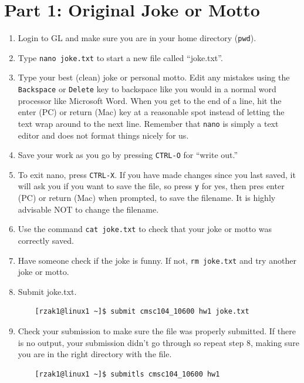 \documentclass[letter,11pt]{article}
\begin{document}
\section*{Part 1: Original Joke or Motto}
\begin{enumerate}
    \item Login to GL and make sure you are in your home directory (\texttt{pwd}).
    \item Type \texttt{nano joke.txt} to start a new file called ``joke.txt''.
    \item Type your best (clean) joke or personal motto. Edit any mistakes using the \texttt{Backspace} or \texttt{Delete} key to backspace like you would in a normal word processor like Microsoft Word. When you get to the end of a line, hit the enter (PC) or return (Mac) key at a reasonable spot instead of letting the text wrap around to the next line. Remember that \texttt{nano} is simply a text editor and does not format things nicely for us.
    \item Save your work as you go by pressing \texttt{CTRL-O} for ``write out.''
    \item To exit nano, press \texttt{CTRL-X}. If you have made changes since you last saved, it will ask you if you want to save the file, so press \texttt{y} for yes, then pres enter (PC) or return (Mac) when prompted, to save the filename. It is highly advisable NOT to change the filename.
    \item Use the command \texttt{cat joke.txt} to check that your joke or motto was correctly saved.
    \item Have someone check if the joke is funny. If not, \texttt{rm joke.txt} and try another joke or motto.
    \item Submit joke.txt.
    \begin{verbatim}
    [rzak1@linux1 ~]$ submit cmsc104_10600 hw1 joke.txt
    \end{verbatim}
    \item Check your submission to make sure the file was properly submitted. If there is no output, your submission didn’t go through so repeat step 8, making sure you are in the right directory with the file.
    \begin{verbatim}
    [rzak1@linux1 ~]$ submitls cmsc104_10600 hw1
    \end{verbatim}
\end{enumerate}
\end{document}
